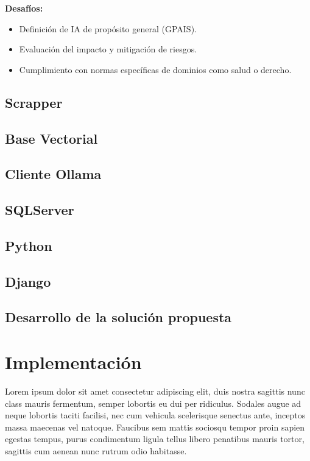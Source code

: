 \documentclass{article}
\begin{document}
\textbf{Desafíos:}
\begin{itemize}[leftmargin=3.5em]
    \item Definición de IA de propósito general (GPAIS).
    \item Evaluación del impacto y mitigación de riesgos.
    \item Cumplimiento con normas específicas de dominios como salud o derecho.
\end{itemize}

\cite{Eticos}

\subsection{Scrapper}
\subsection{Base Vectorial}
\subsection{Cliente Ollama}
\subsection{SQLServer}
\subsection{Python}
\subsection{Django}

\subsection{Desarrollo de la solución propuesta}
\newpage

\section{Implementación}
Lorem ipsum dolor sit amet consectetur adipiscing elit, duis nostra sagittis nunc class mauris fermentum, semper lobortis eu dui per ridiculus. Sodales augue ad neque lobortis taciti facilisi, nec cum vehicula scelerisque senectus ante, inceptos massa maecenas vel natoque. Faucibus sem mattis sociosqu tempor proin sapien egestas tempus, purus condimentum ligula tellus libero penatibus mauris tortor, sagittis cum aenean nunc rutrum odio habitasse.
\end{document}
